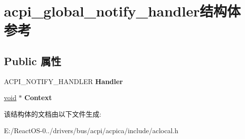 \hypertarget{structacpi__global__notify__handler}{}\section{acpi\+\_\+global\+\_\+notify\+\_\+handler结构体 参考}
\label{structacpi__global__notify__handler}
\subsection*{Public 属性}
\begin{DoxyCompactItemize}
\item 
\mbox{\label{structacpi__global__notify__handler_a56ce47d19bffe34311c4945b8adaa861}} 
A\+C\+P\+I\+\_\+\+N\+O\+T\+I\+F\+Y\+\_\+\+H\+A\+N\+D\+L\+ER {\bfseries Handler}
\item 
\mbox{\label{structacpi__global__notify__handler_aeef6781e43337426253e3002370df7ac}} 
\hyperlink{interfacevoid}{void} $\ast$ {\bfseries Context}
\end{DoxyCompactItemize}


该结构体的文档由以下文件生成\+:\begin{DoxyCompactItemize}
\item 
E\+:/\+React\+O\+S-\/0../drivers/bus/acpi/acpica/include/aclocal.\+h\end{DoxyCompactItemize}
